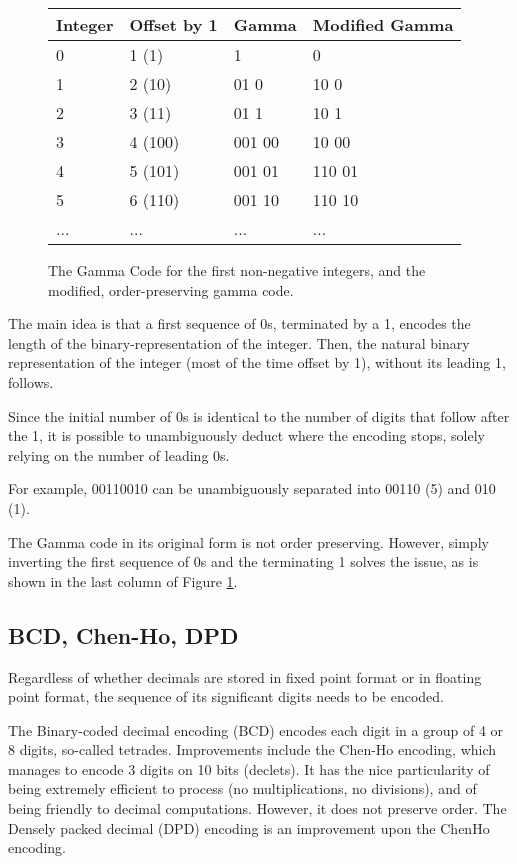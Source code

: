 \documentclass{acm_proc_article-sp}
\begin{document}
\begin{figure}
\caption{The Gamma Code for the first non-negative integers, and the modified, order-preserving gamma code.}
\label{figure-gamma-encoding}
\center
\begin{tabular}{|l|l|l|l|}
\hline
Integer & Offset by 1 & Gamma & Modified Gamma \\
\hline
0 & 1 (1) & 1 & 0\\
\hline
1 & 2 (10) & 01 0 & 10 0 \\
\hline
2 & 3 (11) & 01 1  & 10 1\\
\hline
3 & 4 (100) & 001 00 & 10 00\\
\hline
4 & 5 (101) & 001 01 & 110 01\\
\hline
5 & 6 (110) & 001 10 & 110 10\\
\hline
... & ... & ... & ... \\
\hline
\end{tabular}
\end{figure}

 The main idea is that a first sequence of 0s, terminated by a 1, encodes the length of the binary-representation of the integer. Then, the natural binary representation of the integer (most of the time offset by 1), without its leading 1, follows.

Since the initial number of 0s is identical to the number of digits that follow after the 1, it is possible to unambiguously deduct where the encoding stops, solely relying on the number of leading 0s.

For example, 00110010 can be unambiguously separated into 00110 (5) and 010 (1).

The Gamma code in its original form is not order preserving. However, simply inverting the first sequence of 0s and the terminating 1 solves the issue, as is shown in the last column of Figure \ref{figure-gamma-encoding}.

\subsection{BCD, Chen-Ho, DPD}

Regardless of whether decimals are stored in fixed point format or in floating point format, the sequence of its significant digits needs to be encoded.

The Binary-coded decimal encoding (BCD) encodes each digit in a group of 4 or 8 digits, so-called tetrades. Improvements include the Chen-Ho \cite{ChenHo} encoding, which manages to encode 3 digits on 10 bits (declets). It has the nice particularity of being extremely efficient to process (no multiplications, no divisions), and of being friendly to decimal computations. However, it does not preserve order. The Densely packed decimal (DPD) encoding \cite{DPD} is an improvement upon the ChenHo encoding.
\end{document}
